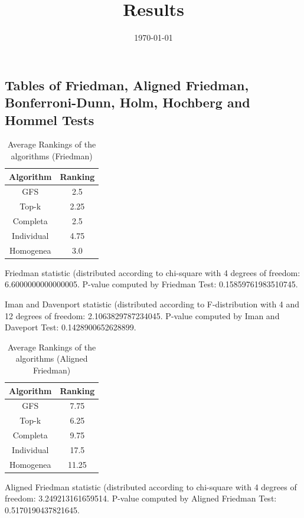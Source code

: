 \documentclass[a4paper,10pt]{article}
\title{Results}
\author{}
\date{\today}
\begin{document}
\begin{landscape}
\oddsidemargin 0in \topmargin 0in\maketitle
\section{Tables of Friedman, Aligned Friedman, Bonferroni-Dunn, Holm, Hochberg and Hommel Tests}
\begin{table}[!htp]
\centering
\caption{Average Rankings of the algorithms (Friedman)
}\begin{tabular}{c|c}
Algorithm&Ranking\\
\hline
GFS&2.5\\
Top-k&2.25\\
Completa&2.5\\
Individual&4.75\\
Homogenea&3.0\\
\end{tabular}
\end{table}


Friedman statistic (distributed according to chi-square with 4 degrees of freedom: 6.6000000000000005. 
P-value computed by Friedman Test: 0.15859761983510745.\newline

Iman and Davenport statistic (distributed according to F-distribution with 4 and 12 degrees of freedom: 2.1063829787234045. 
P-value computed by Iman and Daveport Test: 0.1428900652628899.\newline


\newpage

\begin{table}[!htp]
\centering
\caption{Average Rankings of the algorithms (Aligned Friedman)
}\begin{tabular}{c|c}
Algorithm&Ranking\\
\hline
GFS&7.75\\
Top-k&6.25\\
Completa&9.75\\
Individual&17.5\\
Homogenea&11.25\\
\end{tabular}
\end{table}


Aligned Friedman statistic (distributed according to chi-square with 4 degrees of freedom: 3.249213161659514. 
P-value computed by Aligned Friedman Test: 0.5170190437821645.\newline



\end{landscape}
\end{document}
